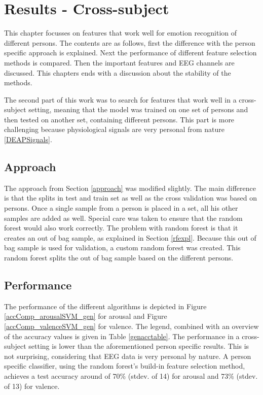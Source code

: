 \chapter{Results - Cross-subject}
{\samenvatting This chapter focusses on features that work well for emotion recognition of different persons. The contents are as follows, first the difference with the person specific approach is explained. Next the performance of different feature selection methods is compared. Then the important features and EEG channels are discussed. This chapters ends with a discussion about the stability of the methods.}

The second part of this work was to search for features that work well in a cross-subject setting, meaning that the model was trained on one set of persons and then tested on another set, containing different persons. This part is more challenging because physiological signals are very personal from nature \ref{DEAPSignals}.

\section{Approach}

The approach from Section \ref{approach} was modified slightly. The main difference is that the splits in test and train set as well as the cross validation was based on persons. Once a single sample from a person is placed in a set, all his other samples are added as well. Special care was taken to ensure that the random forest would also work correctly. The problem with random forest is that it creates an out of bag sample, as explained in Section \ref{rfexpl}. Because this out of bag sample is used for validation, a custom random forest was created. This random forest splits the out of bag sample based on the different persons.

\section{Performance}
The performance of the different algorithms is depicted in Figure \ref{accComp_arousalSVM_gen} for arousal and Figure \ref{accComp_valenceSVM_gen} for valence. The legend, combined with an overview of the accuracy values is given in Table \ref{genacctable}. The performance in a cross-subject setting is lower than the aforementioned person specific results. This is not surprising, considering that EEG data is very personal by nature. A person specific classifier, using the random forest's build-in feature selection method, achieves a test accuracy around of 70\% (stdev. of 14) for arousal and 73\% (stdev. of 13) for valence.

